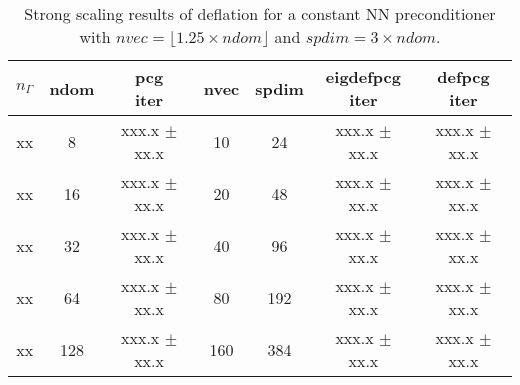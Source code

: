 \documentclass{article}
\begin{document}
\begin{table}[ht]
	\caption{Strong scaling results of deflation for a constant NN preconditioner with $nvec=\lfloor1.25\times ndom\rfloor$ and $spdim=3\times ndom$.}
	\centering
	\begin{tabular}{|c|c|c|c|c|c|c|}
		\hline
		$n_\Gamma$ & ndom & \makecell{pcg\\ iter} & nvec & spdim & \makecell{eigdefpcg\\ iter} & \makecell{defpcg\\ iter}\\
		\hline
		xx  &   8 & xxx.x $\pm$  xx.x &  10 &  24 & xxx.x $\pm$ xx.x & xxx.x $\pm$ xx.x \\
		xx  &  16 & xxx.x $\pm$  xx.x &  20 &  48 & xxx.x $\pm$ xx.x & xxx.x $\pm$ xx.x \\
		xx  &  32 & xxx.x $\pm$  xx.x &  40 &  96 & xxx.x $\pm$ xx.x & xxx.x $\pm$ xx.x \\
		xx  &  64 & xxx.x $\pm$  xx.x &  80 & 192 & xxx.x $\pm$ xx.x & xxx.x $\pm$ xx.x \\
		xx  & 128 & xxx.x $\pm$  xx.x & 160 & 384 & xxx.x $\pm$ xx.x & xxx.x $\pm$ xx.x \\
		\hline
	\end{tabular}
	\label{Tab:040}
\end{table}
\end{document}
